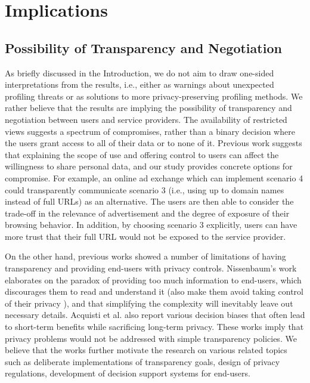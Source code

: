\section{Implications}
\subsection{Possibility of Transparency and Negotiation}
As briefly discussed in the Introduction, we do not aim to draw one-sided interpretations from the results, i.e., either as  warnings about unexpected profiling threats or as solutions to more privacy-preserving profiling methods. We rather believe that the results are implying the possibility of transparency and negotiation between users and service providers. The availability of restricted views suggests a spectrum of compromises, rather than a binary decision where the users grant access to all of their data or to none of it. Previous work suggests \cite{leon2013matters} that explaining the scope of use and offering control to users can affect the willingness to share personal data, and our study provides concrete options for compromise. For example, an online ad exchange which can implement scenario 4 could transparently communicate scenario 3 (i.e., using up to domain names instead of full URLs) as an alternative. The users are then able to consider the trade-off in the relevance of advertisement and the degree of exposure of their browsing behavior. In addition, by choosing scenario 3 explicitly, users can have more trust that their full URL would not be exposed to the service provider. 

On the other hand, previous works showed a number of limitations of having transparency and providing end-users with privacy controls. Nissenbaum's work \cite{nissenbaum2011contextual} elaborates on the paradox of providing too much information to end-users, which discourages them to read and understand it (also make them avoid taking control of their privacy \cite{compano2010policy}), and that simplifying the complexity will inevitably leave out necessary details. Acquisti et al. \cite{acquisti2005privacy} also report various decision biases that often lead to short-term benefits while sacrificing long-term privacy. These works imply that privacy problems would not be addressed with simple transparency policies. We believe that the works further motivate the research on various related topics such as deliberate implementations of transparency goals, design of privacy regulations, development of decision support systems for end-users.

